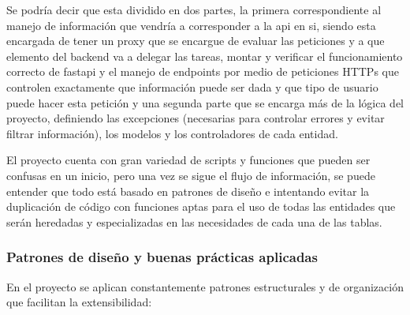 \documentclass[12pt, a4paper]{article}
\begin{document}
Se podría decir que esta dividido en dos partes, la primera correspondiente al manejo de información que vendría a corresponder a la api en si, siendo esta encargada de tener un proxy que se encargue de evaluar las peticiones y a que elemento del backend va a delegar las tareas, montar y verificar el funcionamiento correcto de fastapi y el manejo de endpoints por medio de peticiones HTTPs que controlen exactamente que información puede ser dada y que tipo de usuario puede hacer esta petición y una segunda parte que se encarga más de la lógica del proyecto, definiendo las excepciones (necesarias para controlar errores y evitar filtrar información), los modelos y los controladores de cada entidad.

El proyecto cuenta con gran variedad de scripts y funciones que pueden ser confusas en un inicio, pero una vez se sigue el flujo de información, se puede entender que todo está basado en patrones de diseño e intentando evitar la duplicación de código con funciones aptas para el uso de todas las entidades que serán heredadas y especializadas en las necesidades de cada una de las tablas. 


\subsubsection{Patrones de diseño y buenas prácticas aplicadas}

En el proyecto se aplican constantemente patrones estructurales y de organización que facilitan la extensibilidad:
\end{document}
